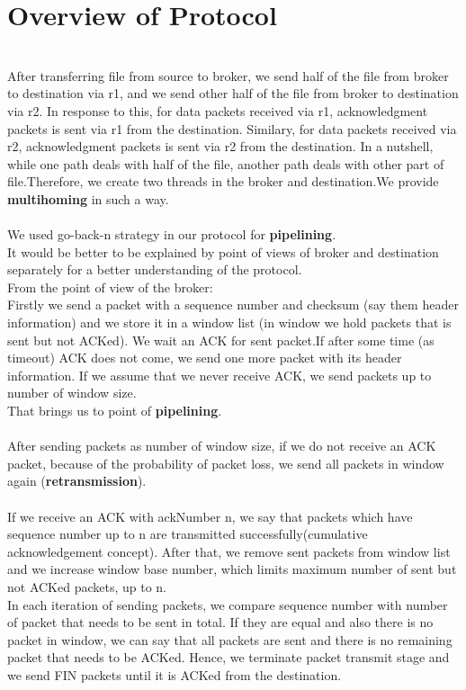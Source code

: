 \documentclass[conference]{IEEEtran}
\begin{document}
\section{Overview of Protocol}\\
After transferring file from source to broker, we send half of the file from broker to destination via r1, and we send other half of the file from broker to destination via r2. In response to this, for data packets received via r1, acknowledgment packets is sent via r1 from the destination. Similary, for data packets received via r2, acknowledgment packets is sent via r2 from the destination. In a nutshell, while one path deals with half of the file, another path deals with other part of file.Therefore, we create two threads in the broker and destination.We provide \textbf{multihoming} in such a way.\\
\\
We used go-back-n strategy in our protocol for \textbf{pipelining}.\\
It would be better to be explained by point of views of broker and destination separately for a better understanding of the protocol.\\
From the point of view of the broker:\\
Firstly we send a packet with a sequence number and checksum (say them header information) and we store it in a window list (in window we hold packets that is sent but not ACKed). We
 wait an ACK for sent packet.If after some time (as timeout) ACK does not come, we send one more packet with its header information. If we assume that we never receive ACK, we send packets up to number of window size.\\
That brings us to point of \textbf{pipelining}.\\
\\
After sending packets as number of window size, if we do not receive an ACK packet, because of the probability of packet loss,  we send all packets in window again (\textbf{retransmission}).\\
\\
 If we receive an ACK with ackNumber n, we say that packets which have sequence number up to n are transmitted successfully(cumulative acknowledgement concept). After that, we remove sent packets from window list and we increase window base number, which limits maximum number of sent but not ACKed packets, up to  n.
\\
In each iteration of sending packets, we compare sequence number with number of packet that needs to be sent in total. If they are equal and also there is no packet in window, we can say that all packets are sent and there is no remaining packet that needs to be ACKed. Hence, we terminate packet transmit stage and we send FIN packets until it is ACKed from the destination.\\
\end{document}
